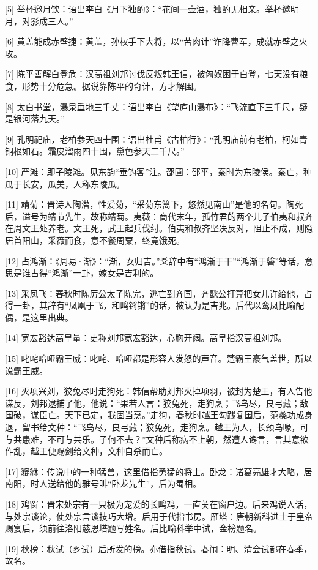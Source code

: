 \documentclass[12pt,UTF8]{ctexbook}
\begin{document}
[5] 举杯邀月饮：语出李白《月下独酌》：“花间一壶酒，独酌无相亲。举杯邀明月，对影成三人。”

[6] 黄盖能成赤壁捷：黄盖，孙权手下大将，以“苦肉计”诈降曹军，成就赤壁之火攻。

[7] 陈平善解白登危：汉高祖刘邦讨伐反叛韩王信，被匈奴困于白登，七天没有粮食，形势十分危急。据说靠陈平的奇计，方才解围。

[8] 太白书堂，瀑泉垂地三千丈：语出李白《望庐山瀑布》：“飞流直下三千尺，疑是银河落九天。”

[9] 孔明祀庙，老柏参天四十围：语出杜甫《古柏行》：“孔明庙前有老柏，柯如青铜根如石。霜皮溜雨四十围，黛色参天二千尺。”

[10] 严滩：即子陵滩。见东韵“垂钓客”注。邵圃：邵平，秦时为东陵侯。秦亡，种瓜于长安，瓜美，人称东陵瓜。

[11] 靖菊：晋诗人陶潜，性爱菊，“采菊东篱下，悠然见南山”是他的名句。陶死后，谥号为靖节先生，故称靖菊。夷薇：商代末年，孤竹君的两个儿子伯夷和叔齐在周文王处养老。文王死，武王起兵伐纣。伯夷和叔齐坚决反对，阻止不成，则隐居首阳山，采薇而食，意不餐周粟，终竟饿死。

[12] 占鸿渐：《周易·渐》：“渐，女归吉。”爻辞中有“鸿渐于干”“鸿渐于磐”等话，意思是谁占得“鸿渐”一卦，嫁女是吉利的。

[13] 采凤飞：春秋时陈厉公太子陈完，逃亡到齐国，齐懿公打算把女儿许给他，占得一卦，其辞有“凤凰于飞，和鸣锵锵”的话，被认为是吉兆。后代以鸾凤比喻配偶，是这里出典。

[14] 宽宏豁达高皇量：史称刘邦宽宏豁达，心胸开阔。高皇指汉高祖刘邦。

[15] 叱咤喑哑霸王威：叱咤、喑哑都是形容人发怒的声音。楚霸王豪气盖世，所以说霸王威。

[16] 灭项兴刘，狡兔尽时走狗死：韩信帮助刘邦灭掉项羽，被封为楚王，有人告他谋反，刘邦逮捕了他，他说：“果若人言：狡兔死，走狗烹；飞鸟尽，良弓藏；敌国破，谋臣亡。天下已定，我固当烹。”走狗，春秋时越王勾践复国后，范蠡功成身退，留书给文种：“飞鸟尽，良弓藏；狡兔死，走狗烹。越王为人，长颈鸟喙，可与共患难，不可与共乐。子何不去？”文种后称病不上朝，然遭人谗言，言其意欲作乱，越王便赐剑给文种，文种自杀而亡。

[17] 貔貅：传说中的一种猛兽，这里借指勇猛的将士。卧龙：诸葛亮雄才大略，居南阳，时人送给他的雅号叫“卧龙先生”，后为蜀相。

[18] 鸡窗：晋宋处宗有一只极为宠爱的长鸣鸡，一直关在窗户边。后来鸡说人话，与处宗谈论，使处宗言谈技巧大增。后用于代指书房。雁塔：唐朝新科进士于皇帝赐宴后，须前往洛阳慈恩塔题写姓名。后比喻科举中试，金榜题名。

[19] 秋榜：秋试（乡试）后所发的榜。亦借指秋试。春闱：明、清会试都在春季，故名。
\end{document}
